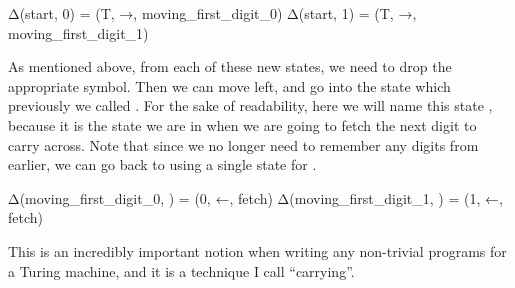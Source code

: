 \begin{stdout}
Δ(start, 0) = (T, →, moving_first_digit_0)
Δ(start, 1) = (T, →, moving_first_digit_1)
\end{stdout}
\begin{center}
\end{center}

As mentioned above, from each of these new states, we need to drop the appropriate symbol. Then we can move left, and go into the state which previously we called . For the sake of readability, here we will name this state , because it is the state we are in when we are going to fetch the next digit to carry across. Note that since we no longer need to remember any digits from earlier, we can go back to using a single state for .
\begin{stdout}
Δ(moving_first_digit_0, ) = (0, ←, fetch)
Δ(moving_first_digit_1, ) = (1, ←, fetch)
\end{stdout}
This is an incredibly important notion when writing any non-trivial programs for a Turing machine, and it is a technique I call ``carrying''.

